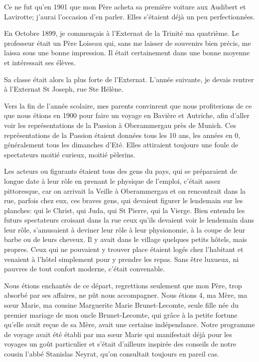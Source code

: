 \documentclass[11pt,a4paper]{report}
\begin{document}
Ce ne fut qu'en 1901 que mon Père acheta sa première voiture aux Audibert et Lavirotte; j'aurai l'occasion d'en parler. Elles s'étaient déjà un peu perfectionnées.

En Octobre 1899, je commençais à l'Externat de la Trinité ma quatrième. Le professeur était un Père Loiseau qui, sans me laisser de souvenirs bien précis, me laissa sous une bonne impression. Il était certainement dans une bonne moyenne et intéressait ses élèves.

Sa classe était alors la plus forte de l'Externat. L'année suivante, je devais rentrer à l'Externat St Joseph, rue Ste Hélène.

Vers la fin de l'année scolaire, mes parents convinrent que nous profiterions de ce que nous étions en 1900 pour faire un voyage en Bavière et Autriche, afin d'aller voir les représentations de la Passion à Oberammergau près de Munich. Ces représentations de la Passion étaient données tous les 10 ans, les années en 0, généralement tous les dimanches d'Eté. Elles attiraient toujours une foule de spectateurs moitié curieux, moitié pèlerins.

Les acteurs ou figurants étaient tous des gens du pays, qui se préparaient de longue date à leur rôle en prenant le physique de l'emploi, c'était assez pittoresque, car on arrivait la Veille à Oberammergau et on rencontrait dans la rue, parfois chez eux, ces braves gens, qui devaient figurer le lendemain sur les planches: qui le Christ, qui Juda, qui St Pierre, qui la Vierge. Bien entendu les futurs spectateurs croisant dans la rue ceux qu'ils devaient voir le lendemain dans leur rôle, s'amusaient à deviner leur rôle à leur physionomie, à la coupe de leur barbe ou de leurs cheveux. Il y avait dans le village quelques petits hôtels, mais propres. Ceux qui ne pouvaient y trouver place étaient logés chez l'habitant et venaient à l'hôtel simplement pour y prendre les repas. Sans être luxueux, ni pauvres de tout confort moderne, c'était convenable.

Nous étions enchantés de ce départ, regrettions seulement que mon Père, trop absorbé par ses affaires, ne pût nous accompagner. Nous étions 4, ma Mère, ma sœur Marie, ma cousine Marguerite Marie Brunet-Lecomte, seule fille née du premier mariage de mon oncle Brunet-Lecomte, qui grâce à la petite fortune qu'elle avait reçue de sa Mère, avait une certaine indépendance. Notre programme de voyage avait été établi par ma sœur Marie qui manifestait déjà pour les voyages un goût particulier et s'était d'ailleurs inspirée des conseils de notre cousin l'abbé Stanislas Neyrat, qu'on consultait toujours en pareil cas.
\end{document}
